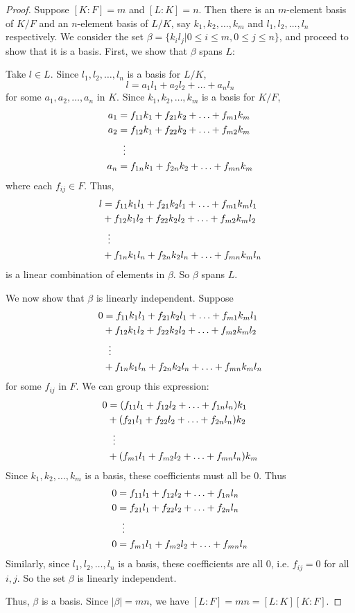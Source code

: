 \documentclass[12pt,leqno]{article}
\numberwithin{equation}{section}
\theoremstyle{plain}
\theoremstyle{definition}
\theoremstyle{remark}
\begin{document}
\begin{proof}
 Suppose $[K:F]=m$ and $[L:K]=n$. Then there is an $m$-element basis of $K/F$ and an $n$-element basis of $L/K$, say $k_1,k_2,\hdots,k_m$ and $l_1,l_2,\hdots,l_n$ respectively. We consider the set $\beta=\{k_il_j|0\leq i\leq m,0\leq j\leq n\}$, and proceed to show that it is a basis. First, we show that $\beta$ spans $L$:

Take $l\in L$. Since $l_1,l_2,\hdots,l_n$ is a basis for $L/K$, \[l=a_1l_1+a_2l_2+\hdots+a_nl_n\] for some $a_1,a_2,\hdots,a_n$ in $K$. Since $k_1,k_2,\hdots,k_m$ is a basis for $K/F$, \begin{align*}a_1&=f_{11}k_1+f_{21}k_2+\hdots+f_{m1}k_m\\a_2&=f_{12}k_1+f_{22}k_2+\hdots+f_{m2}k_m\\&\hskip.08in\vdots\\a_n&=f_{1n}k_1+f_{2n}k_2+\hdots+f_{mn}k_m\end{align*} where each $f_{ij}\in F$. Thus, \begin{align*}l&=f_{11}k_1l_1+f_{21}k_2l_1+\hdots+f_{m1}k_ml_1\\&+f_{12}k_1l_2+f_{22}k_2l_2+\hdots+f_{m2}k_ml_2\\&\hskip.08in\vdots\\&+f_{1n}k_1l_n+f_{2n}k_2l_n+\hdots+f_{mn}k_ml_n\end{align*} is a linear combination of elements in $\beta$. So $\beta$ spans $L$. 

We now show that $\beta$ is linearly independent. Suppose \begin{align*}0&=f_{11}k_1l_1+f_{21}k_2l_1+\hdots+f_{m1}k_ml_1\\&+f_{12}k_1l_2+f_{22}k_2l_2+\hdots+f_{m2}k_ml_2\\&\hskip.08in\vdots\\&+f_{1n}k_1l_n+f_{2n}k_2l_n+\hdots+f_{mn}k_ml_n\end{align*} for some $f_{ij}$ in $F$. We can group this expression:\begin{align*}0&=(f_{11}l_1+f_{12}l_2+\hdots+f_{1n}l_n)k_1\\&+(f_{21}l_1+f_{22}l_2+\hdots+f_{2n}l_n)k_2\\&\hskip.08in\vdots\\&+(f_{m1}l_1+f_{m2}l_2+\hdots+f_{mn}l_n)k_m\end{align*} Since $k_1,k_2,\hdots,k_m$ is a basis, these coefficients must all be 0. Thus \begin{align*}0&=f_{11}l_1+f_{12}l_2+\hdots+f_{1n}l_n\\0&=f_{21}l_1+f_{22}l_2+\hdots+f_{2n}l_n\\&\hskip.08in\vdots\\0&=f_{m1}l_1+f_{m2}l_2+\hdots+f_{mn}l_n\end{align*} Similarly, since $l_1,l_2,\hdots,l_n$ is a basis, these coefficients are all 0, i.e. $f_{ij}=0$ for all $i,j$. So the set $\beta$ is linearly independent.

Thus, $\beta$ is a basis. Since $|\beta|=mn$, we have $[L:F]=mn=[L:K][K:F]$.
\end{proof}
\end{document}

